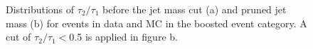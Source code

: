\begin{figure}[hbtp]\begin{center}
 \caption{Distributions of $\tau_2/\tau_1$ before the jet mass cut (a) and pruned jet mass (b) for events in data and MC in the boosted event category. 
 A cut of $\tau_2/\tau_1<$0.5 is applied in figure b.}
 \label{fig:boostvtagvars}\end{center}\end{figure}

